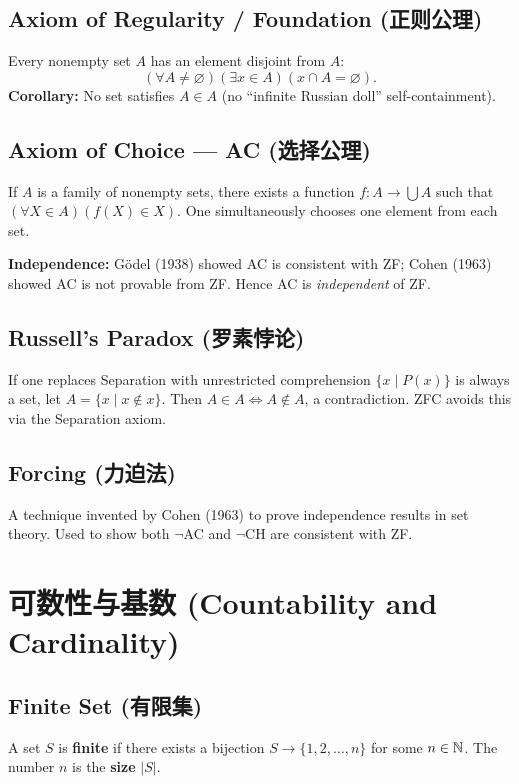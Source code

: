 \documentclass{article}
\begin{document}
\subsection{Axiom of Regularity / Foundation (正则公理)}\label{def:regularity}
Every nonempty set $A$ has an element disjoint from $A$:
\[
  (\forall A \neq \varnothing)(\exists x \in A)(x \cap A = \varnothing).
\]
\textbf{Corollary:} No set satisfies $A \in A$ (no ``infinite Russian
doll'' self-containment).

\subsection{Axiom of Choice --- AC (选择公理)}\label{def:ac}
If $A$ is a family of nonempty sets, there exists a function $f : A
\to \bigcup A$ such that $(\forall X \in A)(f(X) \in X)$.
One simultaneously chooses one element from each set.

\textbf{Independence:} G\"odel (1938) showed AC is consistent with
ZF; Cohen (1963) showed AC is not provable from ZF. Hence AC is
\emph{independent} of ZF.

\subsection{Russell's Paradox (罗素悖论)}\label{def:russell}
If one replaces Separation with unrestricted comprehension $\{x \mid
P(x)\}$ is always a set, let $A = \{x \mid x \notin x\}$. Then $A \in
A \Leftrightarrow A \notin A$, a contradiction. ZFC avoids this via
the Separation axiom.

\subsection{Forcing (力迫法)}\label{def:forcing}
A technique invented by Cohen (1963) to prove independence results in
set theory. Used to show both $\neg$AC and $\neg$CH are consistent with ZF.

\section{可数性与基数 (Countability and Cardinality)}

\subsection{Finite Set (有限集)}\label{def:finite}
A set $S$ is \textbf{finite} if there exists a bijection $S \to \{1,
2, \ldots, n\}$ for some $n \in \mathbb{N}$. The number $n$ is the \textbf{size} $|S|$.
\end{document}
